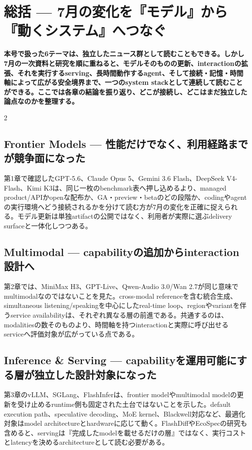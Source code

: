 \section{総括 — 7月の変化を『モデル』から『動くシステム』へつなぐ}
\label{sec:retrospective-synthesis}
\noindent\textbf{本号で扱った6テーマは、独立したニュース群として読むこともできる。しかし7月の一次資料と研究を順に重ねると、モデルそのものの更新、interactionの拡張、それを実行するserving、長時間動作するagent、そして接続・記憶・時間軸によって広がる安全境界まで、一つのsystem stackとして連続して読むことができる。ここでは各章の結論を振り返り、どこが接続し、どこはまだ独立した論点なのかを整理する。}
\medskip
\begin{multicols}{2}
\subsection{Frontier Models — 性能だけでなく、利用経路までが競争面になった}
第1章で確認したGPT-5.6、Claude Opus 5、Gemini 3.6 Flash、DeepSeek V4-Flash、Kimi K3は、同じ一枚のbenchmark表へ押し込めるより、managed product/APIかopenな配布か、GA・preview・betaのどの段階か、codingやagentの実行環境へどう接続されるかを分けて読む方が7月の変化を正確に捉えられる。モデル更新は単独artifactの公開ではなく、利用者が実際に選ぶdelivery surfaceと一体化しつつある。 \cite{src-dca7adc62d79,src-e19fbb75eb44,src-eb71f165025c,src-f6aa679babd7,src-a24fd97eb3d0,src-e547d0d8cbe3,src-9191d43918fc}

\subsection{Multimodal — capabilityの追加からinteraction設計へ}
第2章では、MiniMax H3、GPT-Live、Qwen-Audio 3.0/Wan 2.7が同じ意味でmultimodalなのではないことを見た。cross-modal referenceを含む統合生成、simultaneous listening/speakingを中心にしたreal-time loop、regionやvariantを伴うservice availabilityは、それぞれ異なる層の前進である。共通するのは、modalitiesの数そのものより、時間軸を持つinteractionと実際に呼び出せるserviceへ評価対象が広がっている点である。 \cite{src-d8e13386974c,src-3fb14968493d,src-eac8dfbeb78c}

\subsection{Inference \& Serving — capabilityを運用可能にする層が独立した設計対象になった}
第3章のvLLM、SGLang、FlashInferは、frontier modelやmultimodal modelの更新を受け止めるruntime側も固定された土台ではないことを示した。default execution path、speculative decoding、MoE kernel、Blackwell対応など、最適化対象はmodel architectureとhardwareに応じて動く。FlashDiffやEcoSpecの研究も含めると、servingは『完成したmodelを載せるだけの層』ではなく、実行コストとlatencyを決めるarchitectureとして読む必要がある。 \cite{src-76c7b104c7df,src-b811cc97eff4,src-5a9041d41ad0,src-bf2a6d1b9b56,src-b80517d03022,src-020bbc9ce508,src-50e29a09d75a,src-d6756f2b6aa6}


\end{multicols}
